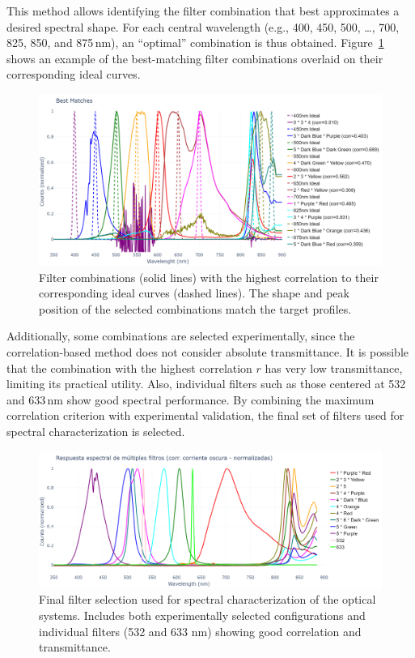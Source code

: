 This method allows identifying the filter combination that best approximates a desired spectral shape. For each central wavelength (e.g., 400, 450, 500, …, 700, 825, 850, and 875\,nm), an “optimal” combination is thus obtained. Figure~\ref{fig:best_corr_combinations} shows an example of the best-matching filter combinations overlaid on their corresponding ideal curves.

\begin{figure}[htbp]
    \centering
    \includegraphics[trim=0mm 0mm 0mm 25mm, clip, width=1\textwidth]{Figures/C3/best_matches.png}
    \caption{Filter combinations (solid lines) with the highest correlation to their corresponding ideal curves (dashed lines). The shape and peak position of the selected combinations match the target profiles.}
    \label{fig:best_corr_combinations}
\end{figure}

\medskip

\noindent
Additionally, some combinations are selected experimentally, since the correlation-based method does not consider absolute transmittance. It is possible that the combination with the highest correlation \(r\) has very low transmittance, limiting its practical utility. Also, individual filters such as those centered at 532 and 633\,nm show good spectral performance. By combining the maximum correlation criterion with experimental validation, the final set of filters used for spectral characterization is selected.

\begin{figure}[htbp]
    \centering
    \includegraphics[width=1\textwidth]{Figures/C3/filt_select.png}
    \caption{Final filter selection used for spectral characterization of the optical systems. Includes both experimentally selected configurations and individual filters (532 and 633 nm) showing good correlation and transmittance.}
    \label{fig:selected_filters}
\end{figure}

